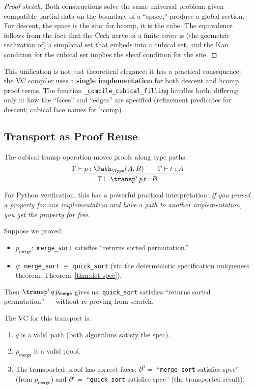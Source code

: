 \begin{proof}[Proof sketch]
Both constructions solve the same universal problem: given
compatible partial data on the boundary of a ``space,'' produce
a global section.  For descent, the space is the site; for
\textsf{hcomp}, it is the cube.  The equivalence follows from
the fact that the Čech nerve of a finite cover is (the geometric
realization of) a simplicial set that embeds into a cubical set,
and the Kan condition for the cubical set implies the sheaf
condition for the site.
\end{proof}

\begin{remark}
This unification is not just theoretical elegance; it has a
practical consequence: the VC compiler uses a \textbf{single
implementation} for both descent and \textsf{hcomp} proof terms.
The function \texttt{\_compile\_cubical\_filling} handles both,
differing only in how the ``faces'' and ``edges'' are specified
(refinement predicates for descent; cubical face names for
\textsf{hcomp}).
\end{remark}


\subsection{Transport as Proof Reuse}
\label{sec:transport-reuse}

The cubical \textsf{transp} operation moves proofs along type paths:
\[
  \frac{\Gamma \vdash p : \Path_\Type(A, B) \qquad
        \Gamma \vdash t : A}
       {\Gamma \vdash \transp^i\, p\, t : B}
\]

For Python verification, this has a powerful practical interpretation:
\emph{if you proved a property for one implementation and have a path
to another implementation, you get the property for free}.

\begin{example}
\label{ex:transport-algo}
Suppose we proved:
\begin{itemize}
\item $p_\mathsf{merge} :$ \texttt{merge\_sort} satisfies
  ``returns sorted permutation.''
\item $q :$ \texttt{merge\_sort} $\equiv$ \texttt{quick\_sort}
  (via the deterministic specification uniqueness theorem,
  Theorem~\ref{thm:det-spec}).
\end{itemize}
Then $\transp^i\, q\, p_\mathsf{merge}$ gives us:
\texttt{quick\_sort} satisfies ``returns sorted permutation''
--- without re-proving from scratch.

The VC for this transport is:
\begin{enumerate}
\item $q$ is a valid path (both algorithms satisfy the spec).
\item $p_\mathsf{merge}$ is a valid proof.
\item The transported proof has correct faces:
  $\partial^0 = $ ``\texttt{merge\_sort} satisfies spec'' (from
  $p_\mathsf{merge}$) and $\partial^1 = $
  ``\texttt{quick\_sort} satisfies spec'' (the transported result).
\end{enumerate}
\end{example}

